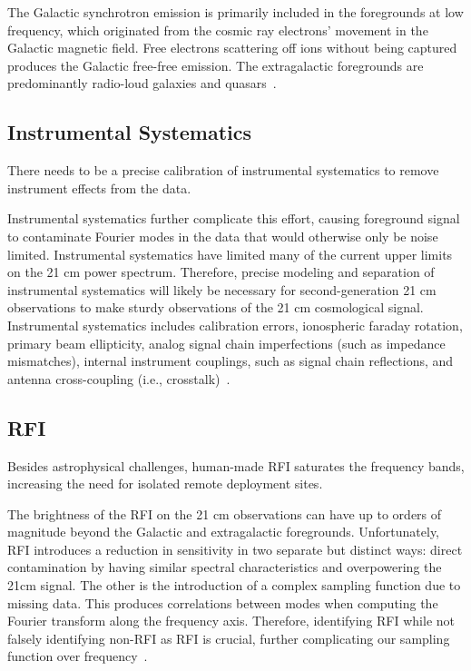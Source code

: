 	    The Galactic synchrotron emission is primarily included in the foregrounds at low frequency, which originated from the cosmic ray electrons' movement in the Galactic magnetic field. Free electrons scattering off ions without being captured produces the Galactic free-free emission. The extragalactic foregrounds are predominantly radio-loud galaxies and quasars~\citep{2018RAA....18..114H, 2008MNRAS.389.1319J}.
	    
	    \subsection*{Instrumental Systematics}
	    
	    There needs to be a precise calibration of instrumental systematics to remove instrument effects from the data.
	    
	    Instrumental systematics further complicate this effort, causing foreground signal to contaminate Fourier modes in the data that would otherwise only be noise limited. Instrumental systematics have limited many of the current upper limits on the 21 cm power spectrum. Therefore, precise modeling and separation of instrumental systematics will likely be necessary for second-generation 21 cm observations to make sturdy observations of the 21 cm cosmological signal. Instrumental systematics includes calibration errors, ionospheric faraday rotation, primary beam ellipticity, analog signal chain imperfections (such as impedance mismatches), internal instrument couplings, such as signal chain reflections, and antenna cross-coupling (i.e., crosstalk)~\citep{2020ApJ...888...70K}.
	    
	    
	    
	    \subsection*{RFI}
	    
	    Besides astrophysical challenges, human-made RFI saturates the frequency bands, increasing the need for isolated remote deployment sites. 
	    
	    The brightness of the RFI on the 21 cm observations can have up to orders of magnitude beyond the Galactic and extragalactic foregrounds. Unfortunately, RFI introduces a reduction in sensitivity in two separate but distinct ways: direct contamination by having similar spectral characteristics and overpowering the 21cm signal. The other is the introduction of a complex sampling function due to missing data. This produces correlations between modes when computing the Fourier transform along the frequency axis. Therefore,  identifying RFI while not falsely identifying non-RFI as RFI is crucial, further complicating our sampling function over frequency~\citep{2019MNRAS.488.2605K}.
	    
